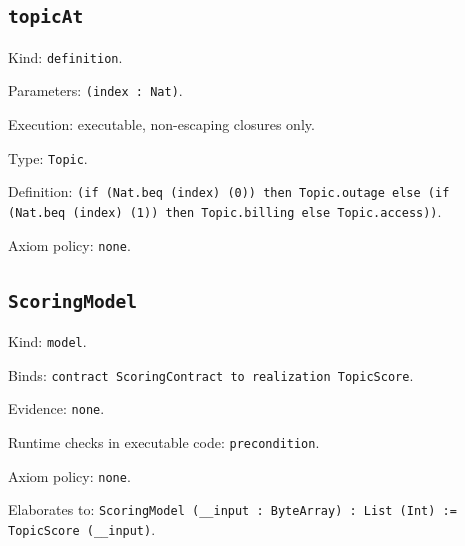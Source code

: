 \documentclass[11pt]{article}
\begin{document}
\subsection*{\texttt{topicAt}}
\noindent Kind: \texttt{definition}.\par
\noindent Parameters: \texttt{(index : Nat)}.\par
\noindent Execution: executable, non-escaping closures only.\par
\noindent Type: \texttt{Topic}.\par
\noindent Definition: \texttt{(if (Nat.beq (index) (0)) then Topic.outage else (if (Nat.beq (index) (1)) then Topic.billing else Topic.access))}.\par
\noindent Axiom policy: \texttt{none}.\par
\subsection*{\texttt{ScoringModel}}
\noindent Kind: \texttt{model}.\par
\noindent Binds: \texttt{contract ScoringContract to realization TopicScore}.\par
\noindent Evidence: \texttt{none}.\par
\noindent Runtime checks in executable code: \texttt{precondition}.\par
\noindent Axiom policy: \texttt{none}.\par
\noindent Elaborates to: \texttt{ScoringModel (\_\_input : ByteArray) : List (Int) := TopicScore (\_\_input)}.\par
\end{document}
